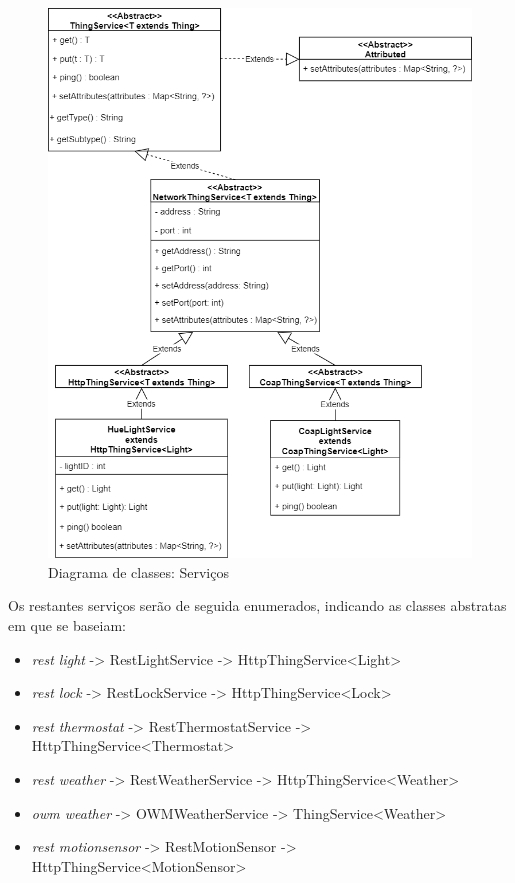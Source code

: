 \begin{figure}[H]
  \centering
        \includegraphics[scale=0.5]{img/hub-services.png}
  \caption{Diagrama de classes: Serviços}
\end{figure}

\newpage

Os restantes serviços serão de seguida enumerados, indicando as classes abstratas em que se baseiam:
\begin{itemize}
    \item \textit{rest light} -> RestLightService -> HttpThingService<Light>
    \item \textit{rest lock} -> RestLockService -> HttpThingService<Lock>
    \item \textit{rest thermostat} -> RestThermostatService -> HttpThingService<Thermostat>
    \item \textit{rest weather} -> RestWeatherService -> HttpThingService<Weather>
    \item \textit{owm weather} -> OWMWeatherService -> ThingService<Weather>
    \item \textit{rest motionsensor} -> RestMotionSensor -> HttpThingService<MotionSensor>
\end{itemize}


